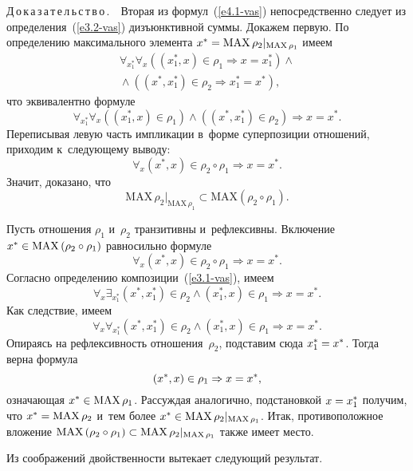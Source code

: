 \begin{multicols}{2}
 \smallskip
 
 \noindent
    Д\,о\,к\,а\,з\,а\,т\,е\,л\,ь\,с\,т\,в\,о\,.\ \ Вторая из формул~(\ref{e4.1-vas}) 
непосредственно следует из определения~(\ref{e3.2-vas}) дизъ\-юнк\-тив\-ной суммы. 
Докажем пер\-вую. По определению максимального элемента $x^*\hm= \mathrm{MAX}\,\rho_2\vert_{\mathrm{MAX}\,\rho_1}$ \mbox{имеем}
    \begin{multline*}
    \forall_{x_1^*} \forall_x \left( \left( x_1^*,x\right)\in\rho_1 \Rightarrow 
x=x_1^*\right) \wedge{}\\
{}\wedge  \left(\left( x^*,x_1^*\right)\in\rho_2\Rightarrow x_1^*=x^*\right),
 \end{multline*}
что эквивалентно формуле 
$$
\forall_{x_1^*} \forall_x \left(\left( x_1^*, x\right)\in \rho_1\right) \wedge \left(\left( x^*, 
x_1^*\right)\in \rho_2\right) \Rightarrow x=x^*.
$$
Переписывая левую часть импликации в~форме суперпозиции отношений, приходим 
к~сле\-ду\-юще\-му вы\-воду: 
$$
\forall_x \left( x^*, x\right) \in \rho_2\circ\rho_1\Rightarrow x=x^*.
$$
 Значит, доказано, что 
$$
\mathrm{MAX}\,\rho_2\vert_{\mathrm{MAX}\,\rho_1} \subset \mathrm{MAX} \left(\rho_2\circ\rho_1\right).
$$
    
    Пусть отношения $\rho_1$ и~$\rho_2$ транзитивны и~рефлексивны. Включение 
$x^*\hm\in \mathrm{MAX}\,(\rho_2\circ\rho_1)$ рав\-но\-силь\-но фор\-муле 
    $$
    \forall_x \left( x^*,x\right) \in \rho_2\circ\rho_1 \Rightarrow x=x^*.
    $$
     Согласно определению композиции~(\ref{e3.1-vas}), имеем 
    $$
    \forall_x \exists_{x_1^*} \left( x^*, x_1^*\right) \in \rho_2\wedge \left( x_1^*, 
x\right) \in\rho_1\Rightarrow x=x^*.
    $$
     Как следствие, имеем
    $$
    \forall_x \forall_{x_1^*} \left( x^*, x_1^*\right) \in\rho_2\wedge \left( x_1^*, 
x\right) \in\rho_1\Rightarrow x=x^*.
    $$
Опираясь на реф\-лек\-сив\-ность отношения~$\rho_2$, под\-ста\-вим сюда $x_1^*\hm= 
x^*$. Тогда вер\-на формула 
$$
\left( x^*,x\right)\in\rho_1\hm\Rightarrow x= x^*,
$$ 
озна\-ча\-ющая $x^*\hm\in \mathrm{MAX}\,\rho_1$. Рас\-суж\-дая аналогично, под\-ста\-нов\-кой $x\hm= 
x_1^*$ получим, что $x^*\hm= \mathrm{MAX}\,\rho_2$ и~тем более $x^*\hm\in \mathrm{MAX}\,\rho_2\vert_{\mathrm{MAX}\,\rho_1}$. Итак, противоположное вложение 
$\mathrm{MAX}\,(\rho_2\circ\rho_1)\hm\subset \mathrm{MAX}\,\rho_2\vert_{\mathrm{MAX}\,\rho_1}$ так\-же имеет место. 
    
    Из соображений двой\-ст\-вен\-ности вытекает сле\-ду\-ющий результат.
    
    \smallskip
    

\end{multicols}

